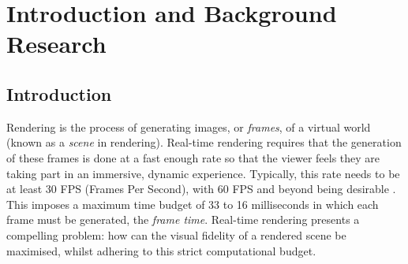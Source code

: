 \chapter{Introduction and Background Research}

\setlength{\parindent}{1em}
\setlength{\parskip}{0em}
\justifying

\label{chapter1}

\section{Introduction}

Rendering is the process of generating images, or \textit{frames}, of a virtual world (known as a \textit{scene} in rendering). Real-time rendering requires that the generation of these frames is done at a fast enough rate so that the viewer feels they are taking part in an immersive, dynamic experience. Typically, this rate needs to be at least 30 FPS (Frames Per Second), with 60 FPS and beyond being desirable \cite{EffectsOfFrameRate}. This imposes a maximum time budget of 33 to 16 milliseconds in which each frame must be generated, the \textit{frame time}. Real-time rendering presents a compelling problem: how can the visual fidelity of a rendered scene be maximised, whilst adhering to this strict computational budget.

